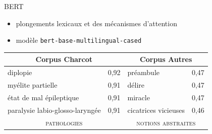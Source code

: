 \begin{frame}{\textsc{BERT}}
\cite{vaswani2021}
    \begin{itemize}
        \item plongements lexicaux et des
mécanismes d’attention
        \item modèle \texttt{bert-base-multilingual-cased}
    \end{itemize}

\begin{table}[]
\begin{tabular}{|ll|ll|}
\hline
\multicolumn{2}{|c|}{\cellcolor[HTML]{EFEFEF}Corpus \og{}Charcot\fg{}} & \multicolumn{2}{c|}{\cellcolor[HTML]{EFEFEF}Corpus \og{}Autres\fg{}}     \\ \hline
\multicolumn{1}{|l|}{diplopie}                & 0,92 & \multicolumn{1}{l|}{préambule}       & 0,47      \\
\multicolumn{1}{|l|}{myélite partielle}       & 0,91 & \multicolumn{1}{l|}{délire}          & 0,47      \\
\multicolumn{1}{|l|}{état de mal épileptique} & 0,91 & \multicolumn{1}{l|}{miracle}         & 0,47      \\
\multicolumn{1}{|l|}{paralysie labio-glosso-laryngée} & 0,91 & \multicolumn{1}{l|}{cicatrices vicieuses} & 0,46 \\ \hline
\multicolumn{2}{|c|}{\cellcolor[HTML]{E1FFE1}\textsc{pathologies}}     & \multicolumn{2}{c|}{\cellcolor[HTML]{FFDFDD}\textsc{notions abstraites}} \\ \hline 
\end{tabular}
\end{table}
\end{frame}